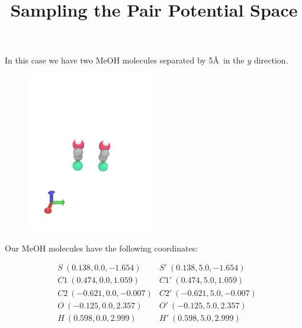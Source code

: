 \documentclass{article}\usepackage[]{graphicx}\usepackage[]{color}
\begin{document}
\title{Sampling the Pair Potential Space}
\maketitle

In this case we have two MeOH molecules separated by 5\AA\ in the $y$ direction.

\begin{figure}[H]
  \center
  \includegraphics[trim=0 0 0 300,clip,width=0.5\textwidth]{two_meoh}
\end{figure}

Our MeOH molecules have the following coordinates:

\begin{align*}
  &S\ (0.138,0.0,-1.654)   &S'\ (0.138,5.0,-1.654)\\
  &C1\ (0.474,0.0,1.059)   &C1'\ (0.474,5.0,1.059)\\
  &C2\ (-0.621,0.0,-0.007) &C2'\ (-0.621,5.0,-0.007)\\
  &O\ (-0.125,0.0,2.357)   &O'\ (-0.125,5.0,2.357)\\
  &H\ (0.598,0.0,2.999)    &H'\ (0.598,5.0,2.999)\\
\end{align*}
\end{document}

